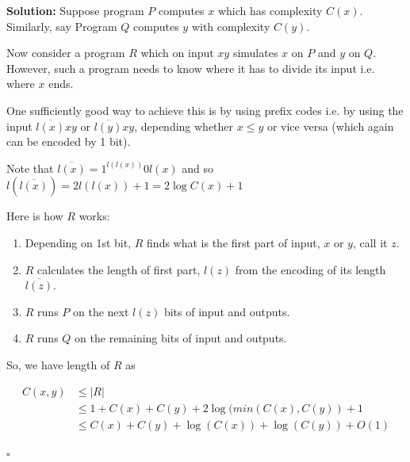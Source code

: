 \documentclass[10pt]{article}
\newcommand{\abs}[1]{{\lvert #1\rvert}}
\newenvironment{solution}{\textbf{Solution:}}{\hfill$\square$}
\begin{document}
\begin{enumerate}
    \begin{solution}
        Suppose program $P$ computes $x$ which has complexity $C(x)$. Similarly, say Program $Q$ computes $y$ with complexity $C(y)$.

        Now consider a program $R$ which on input $xy$ simulates $x$ on $P$ and $y$ on $Q$. However, such a program needs to know where it has to divide its input i.e. where $x$ ends.

        One sufficiently good way to achieve this is by using prefix codes i.e. by using the input $\overline{l(x)}xy$ or $\overline{l(y)}xy$, depending whether $x\leq y$ or vice versa (which again can be encoded by 1 bit).

        Note that $\overline{l(x)}=1^{l(l(x))}0l(x)$ and so $l(\overline{l(x)})=2l(l(x))+1=2\log C(x)+1$

        Here is how $R$ works:

        \begin{enumerate}
            \item Depending on 1st bit, $R$ finds what is the first part of input, $x$ or $y$, call it $z$.
            \item $R$ calculates the length of first part, $l(z)$ from the encoding of its length $\overline{l(z)}$.
            \item $R$ runs $P$ on the next $l(z)$ bits of input and outputs.
            \item $R$ runs $Q$ on the remaining bits of input and outputs.
        \end{enumerate}

        So, we have length of $R$ as 

        \[\begin{split}
            C(x,y) & \leq \abs{R} \\
                   & \leq 1+C(x)+C(y)+2\log(min(C(x),C(y))+1 \\
                   & \leq C(x)+C(y)+\log(C(x))+\log(C(y))+O(1)
        \end{split}\]
        
    \end{solution}
    
\end{enumerate}
\end{document}
